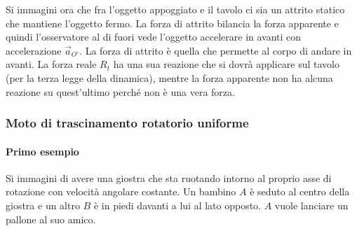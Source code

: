 \begin{figure}[htpb]
\end{figure}
\FloatBarrier
Si immagini ora che fra l'oggetto appoggiato e il tavolo ci sia un attrito statico che mantiene l'oggetto fermo. La forza di attrito bilancia la forza apparente e quindi l'osservatore al di fuori vede l'oggetto accelerare in avanti con accelerazione $\vec{a}_{O'}$. La forza di attrito è quella che permette al corpo di andare in avanti. La forza reale $R_t$ ha una sua reazione che si dovrà applicare sul tavolo (per la terza legge della dinamica), mentre la forza apparente non ha alcuna reazione su quest'ultimo perché non è una vera forza.

\subsubsection{Moto di trascinamento rotatorio uniforme}

\paragraph{Primo esempio} Si immagini di avere una giostra che sta ruotando intorno al proprio asse di rotazione con velocità angolare costante. Un bambino $A$ è seduto al centro della giostra e un altro $B$ è in piedi davanti a lui al lato opposto. $A$ vuole lanciare un pallone al suo amico.

